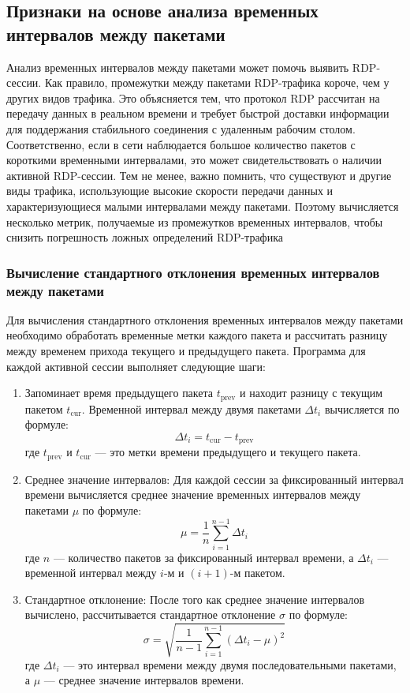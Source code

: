 \documentclass[bachelor, och, coursework]{SCWorks}
\begin{document}
\subsection{Признаки на основе анализа временных интервалов между пакетами}

Анализ временных интервалов между пакетами может помочь выявить RDP-сессии. Как правило, промежутки между пакетами RDP-трафика короче, 
чем у других видов трафика. Это объясняется тем, что протокол RDP рассчитан на передачу данных в реальном времени и требует быстрой 
доставки информации для поддержания стабильного соединения с удаленным рабочим столом. Соответственно, если в сети наблюдается 
большое количество пакетов с короткими временными интервалами, это может свидетельствовать о наличии активной RDP-сессии. Тем 
не менее, важно помнить, что существуют и другие виды трафика, использующие высокие скорости передачи данных и характеризующиеся 
малыми интервалами между пакетами. Поэтому вычисляется несколько метрик, получаемые из промежутков временных интервалов, чтобы снизить погрешность
ложных определений RDP-трафика

\subsubsection{Вычисление стандартного отклонения временных интервалов между пакетами}

Для вычисления стандартного отклонения временных интервалов между пакетами необходимо обработать временные метки каждого пакета и 
рассчитать разницу между временем прихода текущего и предыдущего пакета. Программа для каждой активной сессии выполняет следующие шаги:

\begin{enumerate}
  \item Запоминает время предыдущего пакета \( t_{\text{prev}} \) и находит разницу с текущим пакетом \( t_{\text{cur}} \). Временной интервал между двумя пакетами \( \Delta t_i \) вычисляется по формуле:
   \[
   \Delta t_i = t_{\text{cur}} - t_{\text{prev}}
   \]
   где \( t_{\text{prev}} \) и \( t_{\text{cur}} \) — это метки времени предыдущего и текущего пакета.

  \item Среднее значение интервалов: Для каждой сессии за фиксированный интервал времени вычисляется среднее значение временных интервалов между пакетами \( \mu \) по формуле:
   \[
   \mu = \frac{1}{n} \sum_{i=1}^{n-1} \Delta t_i
   \]
   где \( n \) — количество пакетов за фиксированный интервал времени, а \( \Delta t_i \) — временной интервал между \( i \)-м и \( (i+1) \)-м пакетом.

  \item  Стандартное отклонение: После того как среднее значение интервалов вычислено, рассчитывается стандартное отклонение \( \sigma \) по формуле:
   \[
   \sigma = \sqrt{\frac{1}{n-1} \sum_{i=1}^{n-1} (\Delta t_i - \mu)^2}
   \]
   где \( \Delta t_i \) — это интервал времени между двумя последовательными пакетами, а \( \mu \) — среднее значение интервалов времени.
  \end{enumerate}
\end{document}
